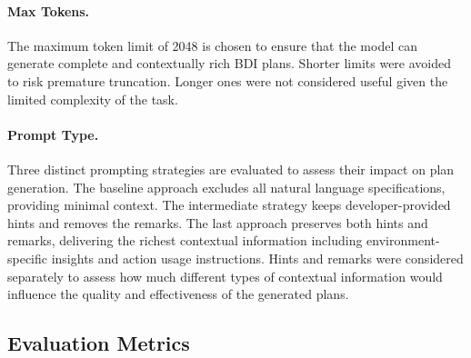 \documentclass[12pt,a4paper,openright,twoside]{book}
\begin{document}
\paragraph{Max Tokens.} The maximum token limit of 2048 is chosen to ensure that the model can generate complete and contextually rich \ac{BDI} plans.
%
Shorter limits were avoided to risk premature truncation. 
%
Longer ones were not considered useful given the limited complexity of the task.

\paragraph{Prompt Type.} Three distinct prompting strategies are evaluated to assess their impact on plan generation. 
%
The baseline approach excludes all natural language specifications, providing minimal context.
%
The intermediate strategy keeps developer-provided hints and removes the remarks.
%
The last approach preserves both hints and remarks, delivering the richest contextual information including environment-specific insights and action usage instructions. 
%
Hints and remarks were considered separately to assess how much different types of contextual information would influence the quality and effectiveness of the generated plans.

\subsection{Evaluation Metrics}\label{sec:metrics}
\end{document}
